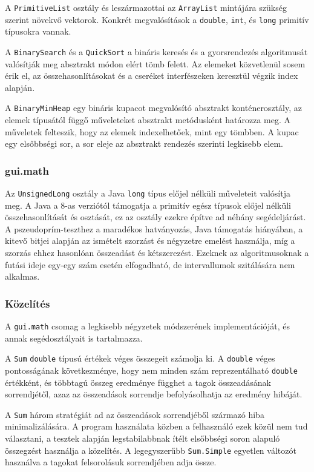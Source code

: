A \texttt{PrimitiveList} osztály és leszármazottai az \texttt{ArrayList} mintájára szükség szerint növekvő vektorok. Konkrét megvalósítások a \texttt{double}, \texttt{int}, és \texttt{long} primitív típusokra vannak.

A \texttt{BinarySearch} és a \texttt{QuickSort} a bináris keresés és a gyorsrendezés algoritmusát valósítják meg absztrakt módon elért tömb felett.
Az elemeket közvetlenül sosem érik el, az összehasonlításokat és a cseréket interfészeken keresztül végzik index alapján.

A \texttt{BinaryMinHeap} egy bináris kupacot megvalósító absztrakt konténerosztály, az elemek típusától függő műveleteket absztrakt metódusként határozza meg.
A műveletek felteszik, hogy az elemek indexelhetőek, mint egy tömbben.
A kupac egy elsőbbségi sor, a sor eleje az absztrakt rendezés szerinti legkisebb elem.

\subsubsection{gui.math}

Az \texttt{UnsignedLong} osztály a Java \texttt{long} típus előjel nélküli műveleteit valósítja meg.
A Java a 8-as verziótól támogatja a primitív egész típusok előjel nélküli összehasonlítását és osztását, ez az osztály ezekre építve ad néhány segédeljárást.
A pszeudoprím-teszthez a maradékos hatványozás, Java támogatás hiányában, a kitevő bitjei alapján az ismételt szorzást és négyzetre emelést használja, míg a szorzás ehhez hasonlóan összeadást és kétszerezést.
Ezeknek az algoritmusoknak a futási ideje egy-egy szám esetén elfogadható, de intervallumok szitálására nem alkalmas.

\subsubsection{Közelítés}

A \texttt{gui.math} csomag a legkisebb négyzetek módszerének implementációját, és annak segédosztályait is tartalmazza.

A \texttt{Sum} \texttt{double} típusú értékek véges összegeit számolja ki.
A \texttt{double} véges pontosságának következménye, hogy nem minden szám reprezentálható \texttt{double} értékként, és többtagú összeg eredménye függhet a tagok összeadásának sorrendjétől, azaz az összeadások sorrendje befolyásolhatja az eredmény hibáját.

A \texttt{Sum} három stratégiát ad az összeadások sorrendjéből származó hiba minimalizálására.
A program használata közben a felhasználó ezek közül nem tud választani, a tesztek alapján legstabilabbnak ítélt elsőbbségi soron alapuló összegzést használja a közelítés.
A legegyszerűbb \texttt{Sum.Simple} egyetlen változót használva a tagokat felsorolásuk sorrendjében adja össze.

